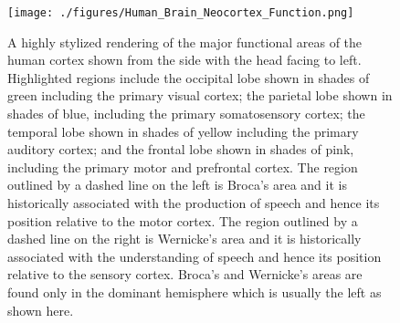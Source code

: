 \begin{figure}
%
  \begin{center} 
    \texttt{[image: ./figures/Human\_Brain\_Neocortex\_Function.png]} 
  \end{center}
%
  \caption{A highly stylized rendering of the major functional areas of the human cortex shown from the side with the head facing to left. Highlighted regions include the occipital lobe shown in shades of green including the primary visual cortex; the parietal lobe shown in shades of blue, including the primary somatosensory cortex; the temporal lobe shown in shades of yellow including the primary auditory cortex; and the frontal lobe shown in shades of pink, including the primary motor and prefrontal cortex. The region outlined by a dashed line on the left is Broca's area and it is historically associated with the production of speech and hence its position relative to the motor cortex. The region outlined by a dashed line on the right is Wernicke’s area and it is historically associated with the understanding of speech and hence its position relative to the sensory cortex. Broca's and Wernicke's areas are found only in the dominant hemisphere which is usually the left as shown here.}
%
  \label{fig_necortex}
%
\end{figure}





